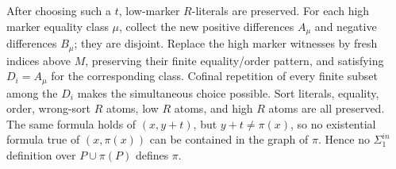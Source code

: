 \documentclass{article}
\begin{document}
After choosing such a $t$, low-marker $R$-literals are preserved.  For
each high marker equality class $\mu$, collect the new positive
differences $A_\mu$ and negative differences $B_\mu$; they are disjoint.
Replace the high marker witnesses by fresh indices above $M$, preserving
their finite equality/order pattern, and satisfying $D_i=A_\mu$ for the
corresponding class.  Cofinal repetition of every finite subset among
the $D_i$ makes the simultaneous choice possible.  Sort literals,
equality, order, wrong-sort $R$ atoms, low $R$ atoms, and high $R$ atoms
are all preserved.  The same formula holds of $(x,y+t)$, but
$y+t\ne\pi(x)$, so no existential formula true of $(x,\pi(x))$ can be
contained in the graph of $\pi$.  Hence no $\Sigma^{in}_1$ definition
over $P\cup\pi(P)$ defines $\pi$.
\end{document}
